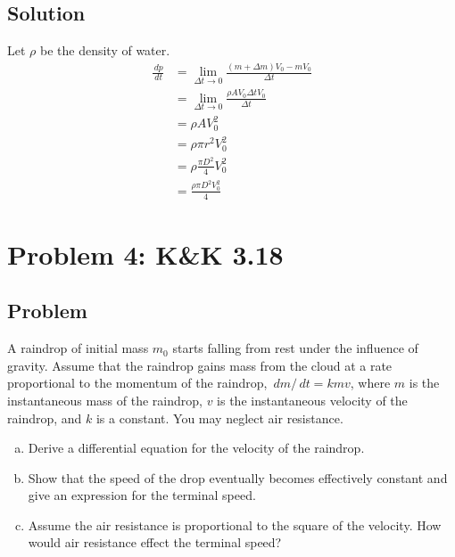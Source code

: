 \documentclass[solutions]{esg8012pset}
\renewcommand{\d}{\,d}
\begin{document}
\subsection*{Solution}
  Let $\rho$ be the density of water.
  \begin{align*}
   \frac{\d p}{\d t} & = \lim_{\Delta t \longrightarrow 0} \frac{(m + \Delta m)V_0 - m V_0}{\Delta t} \\
    & = \lim_{\Delta t \longrightarrow 0} \frac{\rho A V_0 \Delta t V_0}{\Delta t} \\
    & = \rho A V_0^2 \\
    & = \rho \pi r^2 V_0^2 \\
    & = \rho \frac{\pi D^2}{4} V_0^2 \\
    & = \frac{\rho \pi D^2 V_0^2}{4}
  \end{align*}
\section*{Problem 4: K\&K 3.18}
\subsection*{Problem}
  A raindrop of initial mass $m_0$ starts falling from rest under the influence of gravity. Assume that the raindrop gains mass from the cloud at a rate proportional to the momentum of the raindrop, $\d m / \d t = k m v$, where $m$ is the instantaneous mass of the raindrop, $v$ is the instantaneous velocity of the raindrop, and $k$ is a constant. You may neglect air resistance.
  \begin{enumerate}[(a)]
    \item Derive a differential equation for the velocity of the raindrop.
    \item Show that the speed of the drop eventually becomes effectively constant and give an expression for the terminal speed.
    \item Assume the air resistance is proportional to the square of the velocity. How would air resistance effect the terminal speed?
  \end{enumerate}
\end{document}
